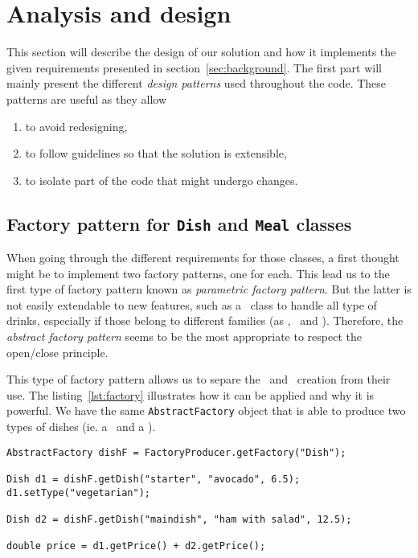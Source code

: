 \section{Analysis and design} %
\label{sec:analysis_and_design}
This section will describe the design of our solution and how
it implements the given requirements presented in section~\ref{sec:background}.
The first part will mainly present the different \emph{design patterns}
used throughout the code.
These patterns are useful as they allow
\begin{enumerate}
  \item to avoid redesigning,
  \item to follow guidelines so that the solution is extensible,
  \item to isolate part of the code that might undergo changes.
\end{enumerate}

\subsection{Factory pattern for \texttt{Dish} and \texttt{Meal} classes} %
\label{sub:factory_pattern_for_the_texttt_dish_and_texttt_meal_classes}
When going through the different requirements for those classes, a first thought
might be to implement two factory patterns, one for each.
This lead us to the first type of factory pattern known as \emph{parametric factory pattern}.
But the latter is not easily extendable to new features, such as
a \Drink~class to handle all type of drinks, especially if
those belong to different families (as \Dish, \Meal~and \Drink).
Therefore, the \emph{abstract factory pattern} seems to be the
most appropriate to respect the open/close principle.

This type of factory pattern allows us to separe the \Dish~and \Meal~creation from their use.
The listing~\ref{lst:factory} illustrates how it can be applied and why it is powerful.
We have the same \lstinline|AbstractFactory| object that is able to produce
two types of dishes (ie. a \Starter~and a \MainDish).

\begin{lstlisting}[caption=Factory pattern for \Dish~and \Meal.,
label=lst:factory]
AbstractFactory dishF = FactoryProducer.getFactory("Dish");

Dish d1 = dishF.getDish("starter", "avocado", 6.5);
d1.setType("vegetarian");

Dish d2 = dishF.getDish("maindish", "ham with salad", 12.5);

double price = d1.getPrice() + d2.getPrice();
\end{lstlisting}

